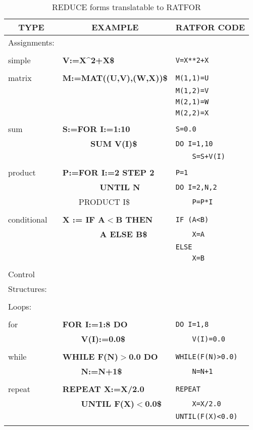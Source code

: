 \begin{table}
\begin{tabular}{||l|l|l||}\hline\hline
\multicolumn{1}{||c|}{\bf TYPE} & \multicolumn{1}{c|}{\bf EXAMPLE}
 & \multicolumn{1}{c||}{\bf RATFOR CODE} \\ \hline\hline

Assignments: & &\\
& & \\
    simple     &{\bf V:=X\^{}2+X\$} &\verb!V=X**2+X!\\
& & \\
    matrix     &{\bf M:=MAT((U,V),(W,X))\$} &\verb!M(1,1)=U!\\
& &\verb!M(1,2)=V!\\
& &\verb!M(2,1)=W!\\
& &\verb!M(2,2)=X!\\
& & \\
    sum &{\bf S:=FOR I:=1:10} &\verb!S=0.0!\\
&{\bf\ \ \ \ \ \ SUM V(I)\$} &\verb!DO I=1,10!\\
& &\verb!    S=S+V(I)!\\
& & \\
    product    &{\bf P:=FOR I:=2 STEP 2} &\verb!P=1!\\
&{\bf\ \ \ \ \ \ \ \ UNTIL N} &\verb!DO I=2,N,2!\\
&{\ \ \ \ PRODUCT I\$} &\verb!    P=P*I!\\
& & \\
conditional & {\bf X := IF A$<$B THEN} &\verb!IF (A<B)!\\
& {\bf \ \ \ \ \ \ \ \ A ELSE B\$} &\verb!    X=A!\\
& &\verb!ELSE!\\
& &\verb!    X=B!\\
& & \\\hline
Control & & \\
Structures: & &\\
& & \\
  Loops: & &\\
& &\\
    for &{\bf FOR I:=1:8 DO} &\verb!DO I=1,8!\\
&{\bf \ \ \ \ V(I):=0.0\$} &\verb!    V(I)=0.0!\\
& & \\
    while      &{\bf WHILE F(N)$>$0.0 DO} &\verb!WHILE(F(N)>0.0)!\\
&{\bf \ \ \ \ N:=N+1\$} &\verb!    N=N+1!\\
& & \\
   repeat     &{\bf REPEAT X:=X/2.0} &\verb!REPEAT!\\
&{\bf \ \ \ \ UNTIL F(X)$<$0.0\$} &\verb!    X=X/2.0!\\
& &\verb!UNTIL(F(X)<0.0)!\\
& & \\\hline\hline
\end{tabular}
\caption{REDUCE forms translatable to RATFOR}
\end{table}

